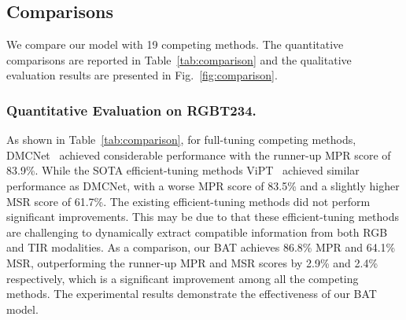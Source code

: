 \documentclass[letterpaper]{article} %
\begin{document}
\subsection{Comparisons}
We compare our model with 19 competing methods. The quantitative comparisons are reported in Table~\ref{tab:comparison} and the qualitative evaluation results are presented in Fig.~\ref{fig:comparison}.

\subsubsection{Quantitative Evaluation on RGBT234.}
As shown in Table~\ref{tab:comparison}, for full-tuning competing methods, DMCNet~\cite{DMCNet} achieved considerable performance with the runner-up MPR score of 83.9\%. While the SOTA efficient-tuning methods ViPT~\cite{zhu2023visual} achieved similar performance as DMCNet, with a worse MPR score of 83.5\% and a slightly higher MSR score of 61.7\%. The existing efficient-tuning methods did not perform significant improvements. This may be due to that these efficient-tuning methods are challenging to dynamically extract compatible information from both RGB and TIR modalities. As a comparison, our BAT achieves 86.8\% MPR and 64.1\% MSR, outperforming the runner-up MPR and MSR scores by 2.9\% and 2.4\% respectively, which is a significant improvement among all the competing methods. The experimental results demonstrate the effectiveness of our BAT model.
\end{document}
